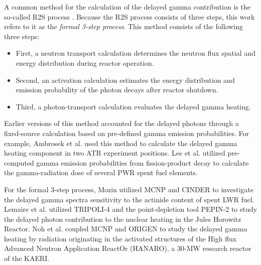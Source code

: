 \documentclass{style/nseJournal}
\begin{document}
A common method for the calculation of the delayed gamma contribution is the so-called \gls*{R2S} process \cite{chen_rigorous_2002}.
Because the \gls*{R2S} process consists of three steps, this work refers to it as the \textit{formal 3-step process}.
This method consists of the following three steps:
\begin{itemize}
  \item First, a neutron transport calculation determines the neutron flux spatial and energy distribution during reactor operation.
  \item Second, an activation calculation estimates the energy distribution and emission probability of the photon decays after reactor shutdown.
  \item Third, a photon-transport calculation evaluates the delayed gamma heating.
\end{itemize}

Earlier versions of this method accounted for the delayed photons through a fixed-source calculation based on pre-defined gamma emission probabilities.
For example, Ambrosek et al. \cite{ambrosek_improved_1995} used this method to calculate the delayed gamma heating component in two \gls*{ATR} experiment positions.
Lee et al. \cite{lee_tripoli_2013} utilized pre-computed gamma emission probabilities from fission-product decay to calculate the gamma-radiation dose of several \gls*{PWR} spent fuel elements.

For the formal 3-step process, Mozin \cite{mozin_delayed_2011} utilized MCNP \cite{mcnp} and CINDER \cite{mcnp-cinder} to investigate the delayed gamma spectra sensitivity to the actinide content of spent LWR fuel.
Lemaire et al. \cite{lemaire_estimation_2015} utilized TRIPOLI-4 \cite{tripoli4} and the point-depletion tool PEPIN-2 \cite{pepin2} to study the delayed photon contribution to the nuclear heating in the Jules Horowitz Reactor.
Noh et al. \cite{noh_estimation_2018} coupled MCNP and ORIGEN to study the delayed gamma heating by radiation originating in the activated structures of the High flux Advanced Neutron Application ReactOr (HANARO), a 30-MW research reactor of the \gls*{KAERI}.
\end{document}
